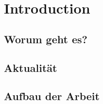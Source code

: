 \chapter{Introduction}

\section{Worum geht es?}

\section{Aktualität}

\section{Aufbau der Arbeit}

